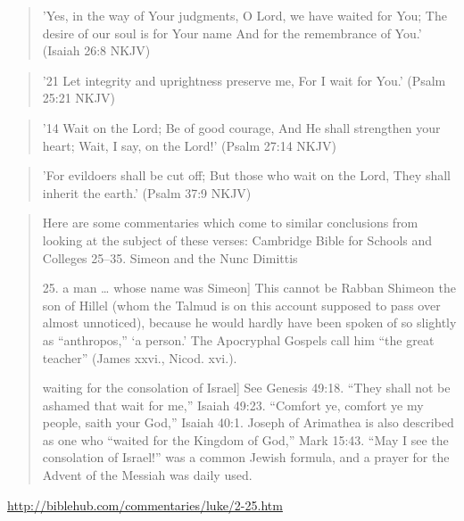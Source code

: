 \documentclass[11pt]{article}
\begin{document}
\begin{quote}
'Yes, in the way of Your judgments,
O Lord, we have waited for You;
The desire of our soul is for Your name
And for the remembrance of You.'
(Isaiah 26:8 NKJV)
\end{quote}
\begin{quote}
'21 Let integrity and uprightness preserve me,
For I wait for You.'
(Psalm 25:21 NKJV)
\end{quote}
\begin{quote}
'14 Wait on the Lord;
Be of good courage,
And He shall strengthen your heart;
Wait, I say, on the Lord!'
(Psalm 27:14 NKJV)
\end{quote}
\begin{quote}
'For evildoers shall be cut off;
But those who wait on the Lord,
They shall inherit the earth.'
(Psalm 37:9 NKJV)
\end{quote}
\begin{quote}
Here are some commentaries which come to similar conclusions from looking at the subject of these verses: \newline
Cambridge Bible for Schools and Colleges
25–35. Simeon and the Nunc Dimittis

25. a man … whose name was Simeon] This cannot be Rabban Shimeon the son of Hillel (whom the Talmud is on this account supposed to pass over almost unnoticed), because he would hardly have been spoken of so slightly as “anthropos,” ‘a person.’ The Apocryphal Gospels call him “the great teacher” (James xxvi., Nicod. xvi.).

waiting for the consolation of Israel] See Genesis 49:18. “They shall not be ashamed that wait for me,” Isaiah 49:23. “Comfort ye, comfort ye my people, saith your God,” Isaiah 40:1. Joseph of Arimathea is also described as one who “waited for the Kingdom of God,” Mark 15:43. “May I see the consolation of Israel!” was a common Jewish formula, and a prayer for the Advent of the Messiah was daily used.
\end{quote}
\url{http://biblehub.com/commentaries/luke/2-25.htm}
\newline
\end{document}
